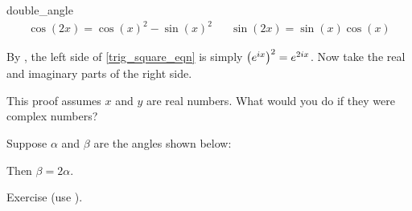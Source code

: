 \documentclass[10pt]{extarticle}
\makeatletter
\newcommand{\<}{\langle}
\renewcommand{\>}{\rangle}
\renewenvironment{proof}[1][\proofname] {\par\pushQED{\qed}{\normalfont\sffamily\bfseries\topsep6\p@\@plus6\p@\relax #1\@addpunct{.} }}{\popQED\endtrivlist\@endpefalse}
\theoremstyle{mystyle}{\newtheorem*{remark}{Remark}}
\theoremstyle{mystyle}{\newtheorem*{remarks}{Remarks}}
\theoremstyle{mystyle}{\newtheorem*{example}{Example}}
\theoremstyle{mystyle}{\newtheorem*{examples}{Examples}}
\theoremstyle{definition}{\newtheorem*{exercise}{Exercise}}
\theoremstyle{warn}
\makeatother
\begin{document}
\begin{theorem}{}{double_angle}
\begin{align}
    \cos(2x)=\cos(x)^2-\sin(x)^2 && \sin(2x)=\sin(x)\cos(x)
\end{align}
\end{theorem}
\begin{proof}
By , the left side of \eqref{trig_square_eqn} is simply $\qty(e^{ix})^2=e^{2ix}$. Now take the real and imaginary parts of the right side.
\end{proof}

This proof assumes $x$ and $y$ are real numbers. What would you do if they were complex numbers?

\begin{corollary}{}{}
Suppose $\alpha$ and $\beta$ are the angles shown below:
\begin{center}
    \begin{minipage}{7cm}
    \begin{center}
    \end{center}
    \end{minipage}
    \begin{minipage}{7cm}
    \begin{center}
    \end{center}
    \end{minipage}
\end{center}
\vspace{-5pt} %
Then $\beta=2\alpha$.
\end{corollary}
\begin{proof}
Exercise (use ).
\end{proof}
\end{document}

